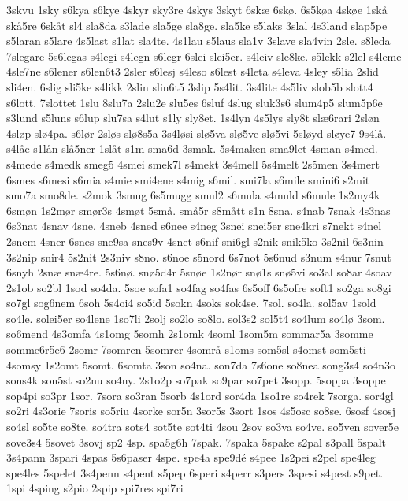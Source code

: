 {3skvu
1sky
s6kya
s6kye
4skyr
sky3re
4skys
3skyt
6sk^^e6
6sk^^f8.
6s5k^^f8a
4sk^^f8e
1sk^^e5
sk^^e55re
6sk^^e5t
sl4
sla8da
s3lade
sla5ge
sla8ge.
sla5ke
s5laks
3slal
4s3land
slap5pe
s5laran
s5lare
4s5last
s1lat
sla4te.
4s1lau
s5laus
sla1v
3slave
sla4vin
2sle.
s8leda
7slegare
5s6legas
s4legi
s4legn
s6legr
6slei
slei5er.
s4leiv
sle8ke.
s5lekk
s2lel
s4leme
4sle7ne
s6lener
s6len6t3
2sler
s6lesj
s4leso
s6lest
s4leta
s4leva
4sley
s5lia
2slid
sli4en.
6slig
sli5ke
s4likk
2slin
slin6t5
3slip
5s4lit.
3s4lite
4s5liv
slob5b
slott4
s6lott.
7slottet
1slu
8slu7a
2slu2e
slu5es
6sluf
4slug
sluk3s6
slum4p5
slum5p6e
s3lund
s5luns
s6lup
slu7sa
s4lut
s1ly
sly8et.
1s4lyn
4s5lys
sly8t
sl^^e66rari
2sl^^f8n
4sl^^f8p
sl^^f84pa.
s6l^^f8r
2sl^^f8s
sl^^f88s5a
3s4l^^f8si
sl^^f85va
sl^^f85ve
sl^^f85vi
5sl^^f8yd
sl^^f8ye7
9s4l^^e5.
s4l^^e5e
s1l^^e5n
sl^^e55ner
1sl^^e5t
s1m
sma6d
3smak.
5s4maken
sma9let
4sman
s4med.
s4mede
s4medk
smeg5
4smei
smek7l
s4mekt
3s4mell
5s4melt
2s5men
3s4mert
6smes
s6mesi
s6mia
s4mie
smi4ene
s4mig
s6mil.
smi7la
s6mile
smini6
s2mit
smo7a
smo8de.
s2mok
3smug
6s5mugg
smul2
s6mula
s4muld
s6mule
1s2my4k
6sm^^f8n
1s2m^^f8r
sm^^f8r3s
4sm^^f8t
5sm^^e5.
sm^^e55r
s8m^^e5tt
s1n
8sna.
s4nab
7snak
4s3nas
6s3nat
4snav
4sne.
4sneb
4sned
s6nee
s4neg
3snei
snei5er
sne4kri
s7nekt
s4nel
2snem
4sner
6snes
sne9sa
snes9v
4snet
s6nif
sni6gl
s2nik
snik5ko
3s2nil
6s3nin
3s2nip
snir4
5s2nit
2s3niv
s8no.
s6noe
s5nord
6s7not
5s6nud
s3num
s4nur
7snut
6snyh
2sn^^e6
sn^^e64re.
5s6n^^f8.
sn^^f85d4r
5sn^^f8e
1s2n^^f8r
sn^^f81s
sn^^f85vi
so3al
so8ar
4soav
2s1ob
so2bl
1sod
so4da.
5soe
sofa1
so4fag
so4fas
6s5off
6s5ofre
soft1
so2ga
so8gi
so7gl
sog6nem
6soh
5s4oi4
so5id
5sokn
4soks
sok4se.
7sol.
so4la.
sol5av
1sold
so4le.
solei5er
so4lene
1so7li
2solj
so2lo
so8lo.
sol3s2
sol5t4
so4lum
so4l^^f8
3som.
so6mend
4s3omfa
4s1omg
5somh
2s1omk
4soml
1som5m
sommar5a
3somme
somme6r5e6
2somr
7somren
5somrer
4somr^^e5
s1oms
som5sl
s4omst
som5sti
4somsy
1s2omt
5somt.
6somta
3son
so4na.
son7da
7s6one
so8nea
song3s4
so4n3o
sons4k
son5st
so2nu
so4ny.
2s1o2p
so7pak
so9par
so7pet
3sopp.
5soppa
3soppe
sop4pi
so3pr
1sor.
7sora
so3ran
5sorb
4s1ord
sor4da
1so1re
so4rek
7sorga.
sor4gl
so2ri
4s3orie
7soris
so5riu
4sorke
sor5n
3sor5s
3sort
1sos
4s5osc
so8se.
6sosf
4sosj
so4sl
so5te
so8te.
so4tra
sots4
sot5te
sot4ti
4sou
2sov
so3va
so4ve.
so5ven
sover5e
sove3s4
5sovet
3sovj
sp2
4sp.
spa5g6h
7spak.
7spaka
5spake
s2pal
s3pall
5spalt
3s4pann
3spari
4spas
5s6paser
4spe.
spe4a
spe9d^^e9
s4pee
1s2pei
s2pel
spe4leg
spe4les
5spelet
3s4penn
s4pent
s5pep
6speri
s4perr
s3pers
3spesi
s4pest
s9pet.
1spi
4sping
s2pio
2spip
spi7res
spi7ri
}
